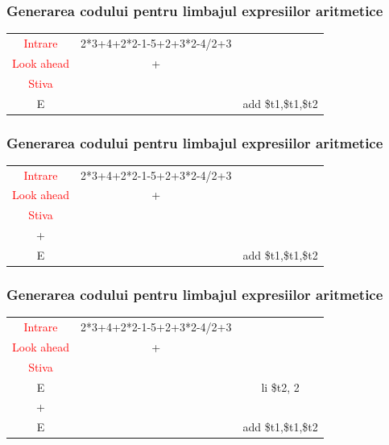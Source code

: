 \documentclass[pdf]{beamer}
\begin{document}
\begin{frame}
\frametitle{Generarea codului pentru limbajul expresiilor aritmetice}
\begin{center}
\begin{tabular}{cc|c|} \cline{1-2}
\multicolumn{1}{|c|}{\textcolor{red}{Intrare}} & {2*3+4+2*2-1-5+2+3*2-4/2+3} \\ \cline{1-2}
\multicolumn{1}{|c|}{\textcolor{red}{Look ahead}} & + \\ \cline{1-2}
\multicolumn{1}{|c|}{\textcolor{red}{Stiva}}  \\
\cline{1-1} \cline{3-3}
\multicolumn{1}{|c|}{E} & & {add \quad \$t1,\$t1,\$t2}\\
\cline{1-1} \cline{3-3}
\end{tabular}
\end{center}
\end{frame}



\begin{frame}
\frametitle{Generarea codului pentru limbajul expresiilor aritmetice}
\begin{center}
\begin{tabular}{cc|c|} \cline{1-2}
\multicolumn{1}{|c|}{\textcolor{red}{Intrare}} & {2*3+4+2*2-1-5+2+3*2-4/2+3} \\ \cline{1-2}
\multicolumn{1}{|c|}{\textcolor{red}{Look ahead}} & + \\ \cline{1-2}
\multicolumn{1}{|c|}{\textcolor{red}{Stiva}}  \\
\cline{1-1} \cline{3-3}
\multicolumn{1}{|c|}{+} & & {}\\
\cline{1-1} \cline{3-3}
\multicolumn{1}{|c|}{E} & & {add \quad \$t1,\$t1,\$t2}\\
\cline{1-1} \cline{3-3}
\end{tabular}
\end{center}
\end{frame}



\begin{frame}
\frametitle{Generarea codului pentru limbajul expresiilor aritmetice}
\begin{center}
\begin{tabular}{cc|c|} \cline{1-2}
\multicolumn{1}{|c|}{\textcolor{red}{Intrare}} & {2*3+4+2*2-1-5+2+3*2-4/2+3} \\ \cline{1-2}
\multicolumn{1}{|c|}{\textcolor{red}{Look ahead}} & + \\ \cline{1-2}
\multicolumn{1}{|c|}{\textcolor{red}{Stiva}}  \\
\cline{1-1} \cline{3-3}
\multicolumn{1}{|c|}{E} & & {li \quad \$t2, 2}\\
\cline{1-1} \cline{3-3}
\multicolumn{1}{|c|}{+} & & {}\\
\cline{1-1} \cline{3-3}
\multicolumn{1}{|c|}{E} & & {add \quad \$t1,\$t1,\$t2}\\
\cline{1-1} \cline{3-3}
\end{tabular}
\end{center}
\end{frame}
\end{document}
